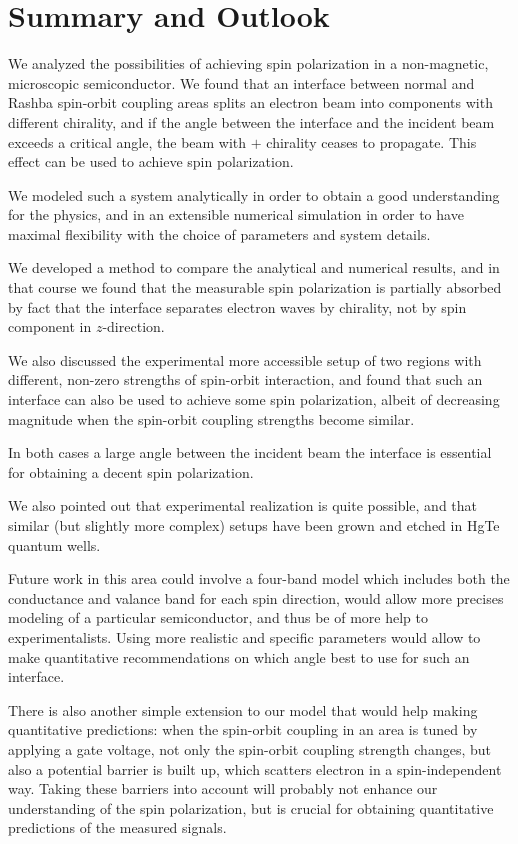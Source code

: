 \chapter{Summary and Outlook}
\label{sec:summary}

We analyzed the possibilities of achieving spin polarization in a
non-magnetic, microscopic semiconductor. We found that an interface between
normal and Rashba spin-orbit coupling areas splits an electron beam into
components with different chirality, and if the angle between the interface
and the incident beam exceeds a critical angle, the beam with $+$ chirality
ceases to propagate. This effect can be used to achieve spin polarization.

We modeled such a system analytically in order to obtain a good understanding
for the physics, and in an extensible numerical simulation in order to have
maximal flexibility with the choice of parameters and system details.

We developed a method to compare the analytical and numerical results, and in
that course we found that the measurable spin polarization is partially
absorbed by fact that the
interface separates electron waves by chirality, not by spin component
in $z$-direction.

We also discussed the experimental more accessible setup of two regions with
different, non-zero strengths of spin-orbit interaction, and found that such an
interface can also be used to achieve some spin polarization, albeit
of decreasing magnitude when the spin-orbit coupling strengths become similar. 

In both cases a large angle between the incident beam the interface is
essential for obtaining a decent spin polarization.

We also pointed out that experimental realization is quite possible, and that
similar (but slightly more complex) setups have been grown and etched in HgTe
quantum wells.

Future work in this area could involve a four-band model which includes both
the conductance and valance band for each spin direction, would
allow more precises modeling of a particular semiconductor, and thus be of
more help to experimentalists. Using more realistic and specific parameters
would allow to make quantitative recommendations on which angle best to use
for such an interface.

There is also another simple extension to our model that would help making
quantitative predictions: when the spin-orbit coupling in an area is tuned by
applying a gate voltage, not only the spin-orbit coupling strength changes,
but also a potential barrier is built up, which scatters electron in a
spin-independent way. Taking these barriers into account will probably not
enhance our understanding of the spin polarization, but is crucial for
obtaining quantitative predictions of the measured signals.

